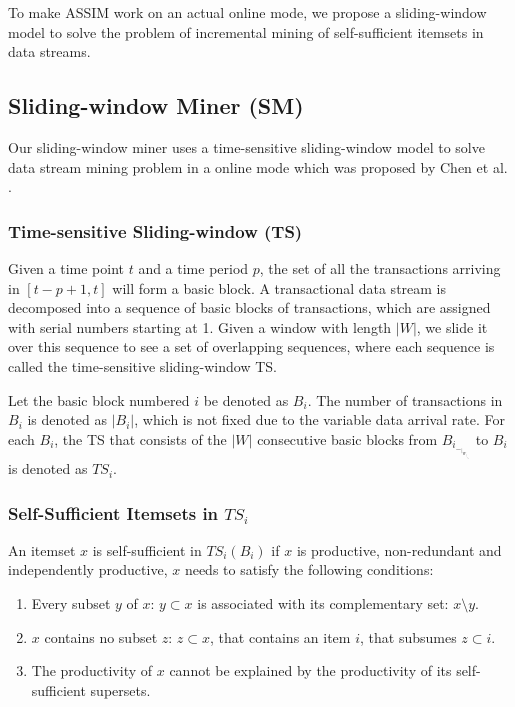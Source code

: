 To make ASSIM work on an actual online mode, we propose a sliding-window model to solve the problem of incremental mining of self-sufficient itemsets in data streams. 

\subsection{Sliding-window Miner (SM)}

Our sliding-window miner uses a time-sensitive sliding-window model to solve data stream mining problem in a online mode which was proposed by Chen et al. \cite{timewin}.

\subsubsection{Time-sensitive Sliding-window (TS)}

Given a time point $t$ and a time period $p$, the set of all the transactions arriving in $[t-p+1, t]$ will form a basic block. A transactional data stream is decomposed into a sequence of basic blocks of transactions, which are assigned with serial numbers starting at 1. Given a window with length $|W|$, we slide it over this sequence to see a set of overlapping sequences, where each sequence is called the time-sensitive sliding-window TS.

Let the basic block numbered $i$ be denoted as $B_i$. The number of transactions in $B_i$ is denoted as $|B_i|$, which is not fixed due to the variable data arrival rate. For each $B_i$, the TS that consists of the $|W|$ consecutive basic blocks from $B_i_-_|_W_|_+_1$ to $B_i$ is denoted as $TS_i$. %

\subsubsection{Self-Sufficient Itemsets in $TS_i$} 

An itemset $x$ is self-sufficient in $TS_i(B_i)$ if $x$ is productive, non-redundant and independently productive, $x$ needs to satisfy the following conditions:

\begin{enumerate}
    \item Every subset $y$ of $x$: $y\subset x$ is associated with its complementary set: $x\setminus y$.
    \item $x$ contains no subset $z$: $z\subset x$, that contains an item $i$, that subsumes $z\subset i$.
    \item The productivity of $x$ cannot be explained by the productivity of its self-sufficient supersets.
\end{enumerate}

